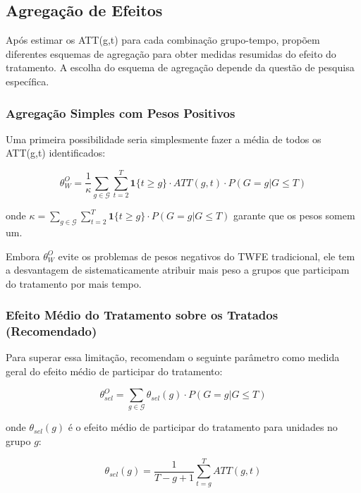 \documentclass[
	12pt,				%
	oneside,			%
	a4paper,			%
	english,			%
	french,				%
	spanish,			%
	brazil				%
	]{abntex2}
\begin{document}
\subsection{Agregação de Efeitos}

Após estimar os ATT(g,t) para cada combinação grupo-tempo,  propõem diferentes esquemas de agregação para obter medidas resumidas do efeito do tratamento. A escolha do esquema de agregação depende da questão de pesquisa específica.

\subsubsection{Agregação Simples com Pesos Positivos}

Uma primeira possibilidade seria simplesmente fazer a média de todos os ATT(g,t) identificados:

\begin{equation}
\theta^O_W = \frac{1}{\kappa} \sum_{g \in \mathcal{G}} \sum_{t=2}^{T} \mathbf{1}\{t \geq g\} \cdot ATT(g,t) \cdot P(G = g | G \leq T)
\end{equation}

onde $\kappa = \sum_{g \in \mathcal{G}} \sum_{t=2}^{T} \mathbf{1}\{t \geq g\} \cdot P(G = g | G \leq T)$ garante que os pesos somem um.

Embora $\theta^O_W$ evite os problemas de pesos negativos do TWFE tradicional, ele tem a desvantagem de sistematicamente atribuir mais peso a grupos que participam do tratamento por mais tempo.

\subsubsection{Efeito Médio do Tratamento sobre os Tratados (Recomendado)}

Para superar essa limitação,  recomendam o seguinte parâmetro como medida geral do efeito médio de participar do tratamento:

\begin{equation}
\theta^O_{sel} = \sum_{g \in \mathcal{G}} \theta_{sel}(g) \cdot P(G = g | G \leq T)
\end{equation}

onde $\theta_{sel}(g)$ é o efeito médio de participar do tratamento para unidades no grupo $g$:

\begin{equation}
\theta_{sel}(g) = \frac{1}{T - g + 1} \sum_{t=g}^{T} ATT(g,t)
\end{equation}
\end{document}
